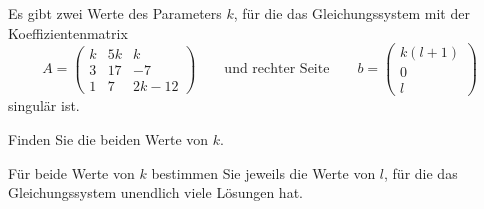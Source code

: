 Es gibt zwei Werte des Parameters $k$, für die 
das Gleichungssystem mit der Koeffizientenmatrix
\[
A=\begin{pmatrix}
 k& 5k&    k  \\
 3& 17&   -7  \\
 1&  7& 2k -12
\end{pmatrix}
\qquad\text{und rechter Seite}\qquad
b=\begin{pmatrix}
k(l+1)\\0\\l
\end{pmatrix}
\]
singulär ist.
\begin{teilaufgaben}
\item Finden Sie die beiden Werte von $k$.
\item Für beide Werte von $k$ bestimmen Sie jeweils die Werte von $l$,
für die das Gleichungssystem unendlich viele Lösungen hat.
\end{teilaufgaben}

